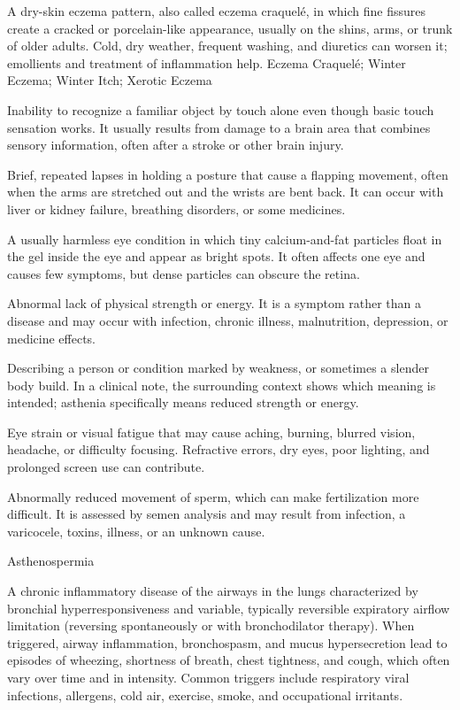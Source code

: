  A dry-skin eczema pattern, also called eczema craquelé, in which fine fissures create a cracked or porcelain-like appearance, usually on the shins, arms, or trunk of older adults. Cold, dry weather, frequent washing, and diuretics can worsen it; emollients and treatment of inflammation help.
\synonyms
Eczema Craquelé; Winter Eczema; Winter Itch; Xerotic Eczema

 Inability to recognize a familiar object by touch alone even though basic touch sensation works. It usually results from damage to a brain area that combines sensory information, often after a stroke or other brain injury.

 Brief, repeated lapses in holding a posture that cause a flapping movement, often when the arms are stretched out and the wrists are bent back. It can occur with liver or kidney failure, breathing disorders, or some medicines.

 A usually harmless eye condition in which tiny calcium-and-fat particles float in the gel inside the eye and appear as bright spots. It often affects one eye and causes few symptoms, but dense particles can obscure the retina.

 Abnormal lack of physical strength or energy. It is a symptom rather than a disease and may occur with infection, chronic illness, malnutrition, depression, or medicine effects.

 Describing a person or condition marked by weakness, or sometimes a slender body build. In a clinical note, the surrounding context shows which meaning is intended; asthenia specifically means reduced strength or energy.

 Eye strain or visual fatigue that may cause aching, burning, blurred vision, headache, or difficulty focusing. Refractive errors, dry eyes, poor lighting, and prolonged screen use can contribute.

 Abnormally reduced movement of sperm, which can make fertilization more difficult. It is assessed by semen analysis and may result from infection, a varicocele, toxins, illness, or an unknown cause.

\synonyms
Asthenospermia

 A chronic inflammatory disease of the airways in the lungs characterized by bronchial hyperresponsiveness and variable, typically reversible expiratory airflow limitation (reversing spontaneously or with bronchodilator therapy). When triggered, airway inflammation, bronchospasm, and mucus hypersecretion lead to episodes of wheezing, shortness of breath, chest tightness, and cough, which often vary over time and in intensity. Common triggers include respiratory viral infections, allergens, cold air, exercise, smoke, and occupational irritants.

